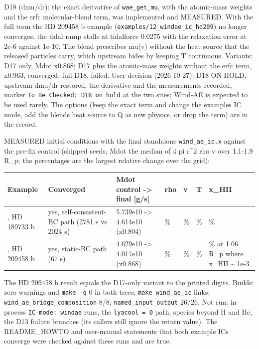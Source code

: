 \documentclass[english,a4paper]{my_memo}
\begin{document}
D18 (dmu/dr): the exact derivative of \texttt{wae\_get\_mu}, with the atomic-mass weights and the erfc molecular-blend term, was implemented and MEASURED. With the full term the HD 209458 b example (\texttt{examples/12\_windae\_ic\_hd209}) no longer converges: the tidal ramp stalls at tidalforce 0.0275 with the relaxation error at 2e-6 against 1e-10. The blend prescribes mu(v) without the heat source that the released particles carry, which upstream hides by keeping T continuous. Variants: D17 only, Mdot x0.868; D17 plus the atomic-mass weights without the erfc term, x0.963, converged; full D18, failed. User decision (2026-10-27): D18 ON HOLD, upstream dmu/dr restored, the derivative and the measurements recorded, marker \texttt{To\ Be\ Checked:\ D18\ on\ hold} at the two sites; Wind-AE is expected to be used rarely. The options (keep the exact term and change the example\textquotesingle s IC mode, add the blend\textquotesingle s heat source to Q as new physics, or drop the term) are in the record.

MEASURED initial conditions with the final standalone \texttt{wind\_ae\_ic.x} against the pre-fix control (shipped seeds; Mdot the median of 4 pi r\^{}2 rho v over 1.1-1.9 R\_p; the percentages are the largest relative change over the grid):

{\def\LTcaptype{none} %
{\small
\begin{longtable}[]{@{}>{\raggedright\arraybackslash}p{\dimexpr(\linewidth-14\tabcolsep)/7\relax}>{\raggedright\arraybackslash}p{\dimexpr(\linewidth-14\tabcolsep)/7\relax}>{\raggedright\arraybackslash}p{\dimexpr(\linewidth-14\tabcolsep)/7\relax}>{\raggedright\arraybackslash}p{\dimexpr(\linewidth-14\tabcolsep)/7\relax}>{\raggedright\arraybackslash}p{\dimexpr(\linewidth-14\tabcolsep)/7\relax}>{\raggedright\arraybackslash}p{\dimexpr(\linewidth-14\tabcolsep)/7\relax}>{\raggedright\arraybackslash}p{\dimexpr(\linewidth-14\tabcolsep)/7\relax}@{}}
\toprule\noalign{}
Example & Converged & Mdot control -\textgreater{} final {[}g/s{]} & rho & v & T & x\_HII \\
\midrule\noalign{}
\endhead
\bottomrule\noalign{}
\endlastfoot
11, HD 189733 b & yes, self-consistent-BC path (2781 s vs 2024 s) & 5.739e10 -\textgreater{} 4.614e10 (x0.804) & 15.4\% & 28.0\% & 10.5\% & 15.2\% \\
12, HD 209458 b & yes, static-BC path (67 s) & 4.629e10 -\textgreater{} 4.017e10 (x0.868) & 12.5\% & 16.0\% & 9.1\% & 45.8\% at 1.06 R\_p where x\_HII \textasciitilde{} 1e-3 \\
\end{longtable}
}
}

The HD 209458 b result equals the D17-only variant to the printed digits. Builds: zero warnings and \texttt{make\ -q} 0 in both trees; \texttt{make\ wind\_ae\_ic} links; \texttt{wind\_ae\_bridge\_composition} 8/8; \texttt{named\_input\_output} 26/26. Not run: in-process \texttt{IC\ mode:\ windae} runs, the \texttt{lyacool\ =\ 0} path, species beyond H and He, the D13 failure branches (its callers still ignore the return value). The README\_HOWTO and user-manual statements that both example ICs converge were checked against these runs and are true.

\appendix

\end{document}
